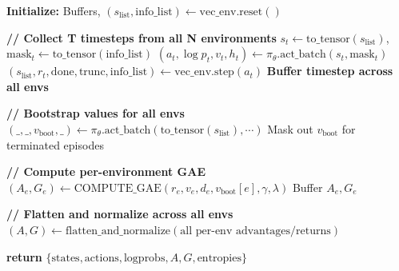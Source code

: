 \documentclass[11pt,a4paper]{article}
\begin{document}
\begin{algorithm}[h]
\caption{COLLECT\_ROLLOUTS: Parallel Rollout with Per-Environment Advantages}
\label{alg:collect_vec}
\begin{algorithmic}[1]



\State \textbf{Initialize:} Buffers, $(s_\text{list}, \text{info\_list}) \leftarrow \text{vec\_env.reset}()$

\State \textbf{// Collect T timesteps from all N environments}
	\State $s_t \leftarrow \text{to\_tensor}(s_\text{list})$, $\text{mask}_t \leftarrow \text{to\_tensor}(\text{info\_list})$
	\State $(a_t, \log p_t, v_t, h_t) \leftarrow \pi_\theta.\text{act\_batch}(s_t, \text{mask}_t)$
	\State $(s_\text{list}, r_t, \text{done}, \text{trunc}, \text{info\_list}) \leftarrow \text{vec\_env.step}(a_t)$
	\State \textbf{Buffer timestep across all envs}
\EndFor

\State \textbf{// Bootstrap values for all envs}
\State $(\_,\_,v_\text{boot},\_) \leftarrow \pi_\theta.\text{act\_batch}(\text{to\_tensor}(s_\text{list}), \cdots)$
\State Mask out $v_\text{boot}$ for terminated episodes

\State \textbf{// Compute per-environment GAE}
	\State $(A_e, G_e) \leftarrow \text{COMPUTE\_GAE}(r_e, v_e, d_e, v_\text{boot}[e], \gamma, \lambda)$
	\State Buffer $A_e, G_e$
\EndFor

\State \textbf{// Flatten and normalize across all envs}
\State $(A, G) \leftarrow \text{flatten\_and\_normalize}(\text{all per-env advantages/returns})$

\State \textbf{return} $\{\text{states}, \text{actions}, \text{logprobs}, A, G, \text{entropies}\}$

\end{algorithmic}
\end{algorithm}

\clearpage
\end{document}
